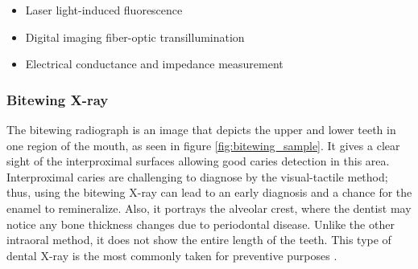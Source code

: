 \begin{itemize}
    \item Laser light-induced fluorescence
    \item Digital imaging fiber-optic transillumination
    \item Electrical conductance and impedance measurement
\end{itemize}

\subsubsection{Bitewing X-ray}
The bitewing radiograph is an image that depicts the upper and lower teeth in one region of the mouth, as seen in figure \ref{fig:bitewing_sample}. It gives a clear sight of the interproximal surfaces allowing good caries detection in this area. Interproximal caries are challenging to diagnose by the visual-tactile method; thus, using the bitewing X-ray can lead to an early diagnosis and a chance for the enamel to remineralize. Also, it portrays the alveolar crest, where the dentist may notice any bone thickness changes due to periodontal disease. Unlike the other intraoral method, it does not show the entire length of the teeth. This type of dental X-ray is the most commonly taken for preventive purposes \cite{2015}.

